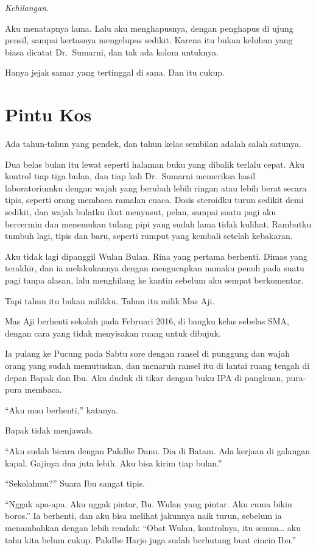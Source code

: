 \documentclass[11pt,twoside,openany]{book}
\makeatletter
\newcommand{\scenebreak}{\par\vspace{0.9em}{\centering\textsc{*\hspace{0.7em}*\hspace{0.7em}*}\par}\vspace{0.9em}\@afterindentfalse\@afterheading}
\makeatother
\begin{document}
\emph{Kehilangan.}

Aku menatapnya lama. Lalu aku menghapusnya, dengan penghapus di ujung pensil, sampai kertasnya mengelupas sedikit. Karena itu bukan keluhan yang biasa dicatat Dr.~Sumarni, dan tak ada kolom untuknya.

Hanya jejak samar yang tertinggal di sana. Dan itu cukup.

\chapter{Pintu Kos}
Ada tahun-tahun yang pendek, dan tahun kelas sembilan adalah salah satunya.

Dua belas bulan itu lewat seperti halaman buku yang dibalik terlalu cepat. Aku kontrol tiap tiga bulan, dan tiap kali Dr.~Sumarni memeriksa hasil laboratoriumku dengan wajah yang berubah lebih ringan atau lebih berat secara tipis, seperti orang membaca ramalan cuaca. Dosis steroidku turun sedikit demi sedikit, dan wajah bulatku ikut menyusut, pelan, sampai suatu pagi aku bercermin dan menemukan tulang pipi yang sudah lama tidak kulihat. Rambutku tumbuh lagi, tipis dan baru, seperti rumput yang kembali setelah kebakaran.

Aku tidak lagi dipanggil Wulan Bulan. Rina yang pertama berhenti. Dimas yang terakhir, dan ia melakukannya dengan mengucapkan namaku penuh pada suatu pagi tanpa alasan, lalu menghilang ke kantin sebelum aku sempat berkomentar.

Tapi tahun itu bukan milikku. Tahun itu milik Mas Aji.

\scenebreak
Mas Aji berhenti sekolah pada Februari 2016, di bangku kelas sebelas SMA, dengan cara yang tidak menyisakan ruang untuk dibujuk.

Ia pulang ke Pucung pada Sabtu sore dengan ransel di punggung dan wajah orang yang sudah memutuskan, dan menaruh ransel itu di lantai ruang tengah di depan Bapak dan Ibu. Aku duduk di tikar dengan buku IPA di pangkuan, pura-pura membaca.

``Aku mau berhenti,'' katanya.

Bapak tidak menjawab.

``Aku sudah bicara dengan Pakdhe Danu. Dia di Batam. Ada kerjaan di galangan kapal. Gajinya dua juta lebih. Aku bisa kirim tiap bulan.''

``Sekolahmu?'' Suara Ibu sangat tipis.

``Nggak apa-apa. Aku nggak pintar, Bu. Wulan yang pintar. Aku cuma bikin boros.'' Ia berhenti, dan aku bisa melihat jakunnya naik turun, sebelum ia menambahkan dengan lebih rendah: ``Obat Wulan, kontrolnya, itu semua\ldots{} aku tahu kita belum cukup. Pakdhe Harjo juga sudah berhutang buat cincin Ibu.''
\end{document}
